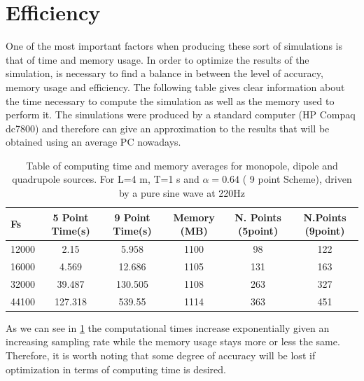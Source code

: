 \section{Efficiency}
\label{chapter5:sec2}
One of the most important factors when producing these sort of simulations is that of time and memory usage. In order to optimize the results of the simulation, is necessary to find a balance in between the level of accuracy, memory usage and efficiency. The following table gives clear information about the time necessary to compute the simulation as well as the memory used to perform it. The simulations were produced by a standard computer (HP Compaq dc7800) and therefore can give an approximation to the results that will be obtained using an average PC nowadays.
\begin{table}[h]
	\centering
	\begin{adjustbox}{\textwidth}
	\small
	\begin{tabular}{|l|c|c|c|c|c|}
		\hline
		Fs & 5 Point Time(s)& 9 Point Time(s) & Memory (MB)& N. Points (5point)&N.Points (9point) \\
		\hline
		12000 & 2.15 & 5.958& 1100&98&122\\
		16000 & 4.569 & 12.686& 1105&131&163\\
		32000 & 39.487& 130.505 &1108 &263& 327\\
		44100 & 127.318 & 539.55 & 1114 & 363&451\\
		\hline
	\end{tabular}
	\end{adjustbox}
	\caption{Table of computing time and memory averages for monopole, dipole and quadrupole sources. For L=4 m, T=1 s and $\alpha=0.64$ ( 9 point Scheme), driven by a pure sine 			wave at 220Hz}
	\label{tab:Times}
\end{table}
As we can see in \ref{tab:Times} the computational times increase exponentially given an increasing sampling rate while the memory usage stays more or less the same. Therefore, it is worth noting that some degree of accuracy will be lost if optimization in terms of computing time is desired. 


